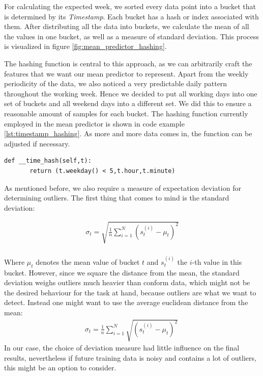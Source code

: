 For calculating the expected week, we sorted every data point into a bucket that is determined by its \textit{Timestamp}. Each bucket has a hash or index associated with them. After distributing all the data into buckets, we calculate the mean of all the values in one bucket, as well as a measure of standard deviation. This process is visualized in figure \ref{fig:mean_predictor_hashing}.

The hashing function is central to this approach, as we can arbitrarily craft the features that we want our mean predictor to represent. Apart from the weekly periodicity of the data, we also noticed a very predictable daily pattern throughout the working week. Hence we decided to put all working days into one set of buckets and all weekend days into a different set. We did this to ensure a reasonable amount of samples for each bucket. The hashing function currently employed in the mean predictor is shown in  code example \ref{lst:timestamp_hashing}. As more and more data comes in, the function can be adjusted if necessary.

\begin{minipage}{\linewidth}
\begin{lstlisting}[caption={Time stamp hashing function used for Mean Predictor},label={lst:timestamp_hashing}]
def __time_hash(self,t):
       return (t.weekday() < 5,t.hour,t.minute)

\end{lstlisting}
\end{minipage}

As mentioned before, we also require a measure of expectation deviation for determining outliers. The first thing that comes to mind is the standard deviation:

\begin{equation}
\begin{aligned}
\sigma_t = \sqrt{\frac{1}{n}\sum_{i=1}^N (s_t^{(i)} - \mu_t)^2}\\
\end{aligned}
\end{equation}

Where $\mu_t$ denotes the mean value of bucket $t$ and $s_t^{(i)}$ the $i$-th value in this bucket. However, since we square the distance from the mean, the standard deviation weighs outliers much heavier than conform data, which might not be the desired behaviour for the task at hand, because outliers are what we want to detect. Instead one might want to use the average euclidean distance from the mean:
\begin{equation}
\begin{aligned}
\sigma_t = \frac{1}{n}\sum_{i=1}^N \sqrt{(s_t^{(i)} - \mu_t)^2}\
\end{aligned}
\end{equation}
In our case, the choice of deviation measure had little influence on the final results, nevertheless if future training data is noisy and contains a lot of outliers, this might be an option to consider. 

